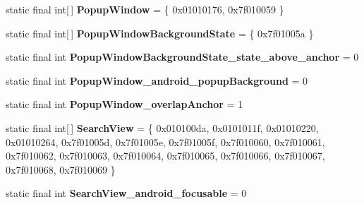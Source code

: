 \begin{DoxyCompactItemize}
\item 
\hypertarget{classandroid_1_1support_1_1v7_1_1appcompat_1_1_r_1_1styleable_abfcd5394a28e12e51efa5ac509687b26}{}static final int\mbox{[}$\,$\mbox{]} {\bfseries Popup\+Window} = \{ 0x01010176, 0x7f010059 \}\label{classandroid_1_1support_1_1v7_1_1appcompat_1_1_r_1_1styleable_abfcd5394a28e12e51efa5ac509687b26}

\item 
\hypertarget{classandroid_1_1support_1_1v7_1_1appcompat_1_1_r_1_1styleable_af780db5a661b33d826f07231dfde13ec}{}static final int\mbox{[}$\,$\mbox{]} {\bfseries Popup\+Window\+Background\+State} = \{ 0x7f01005a \}\label{classandroid_1_1support_1_1v7_1_1appcompat_1_1_r_1_1styleable_af780db5a661b33d826f07231dfde13ec}

\item 
\hypertarget{classandroid_1_1support_1_1v7_1_1appcompat_1_1_r_1_1styleable_a0288416ef672e1d476c6407516b89ee5}{}static final int {\bfseries Popup\+Window\+Background\+State\+\_\+state\+\_\+above\+\_\+anchor} = 0\label{classandroid_1_1support_1_1v7_1_1appcompat_1_1_r_1_1styleable_a0288416ef672e1d476c6407516b89ee5}

\item 
\hypertarget{classandroid_1_1support_1_1v7_1_1appcompat_1_1_r_1_1styleable_ac7f68e4984b94e3ebac98c9575349188}{}static final int {\bfseries Popup\+Window\+\_\+android\+\_\+popup\+Background} = 0\label{classandroid_1_1support_1_1v7_1_1appcompat_1_1_r_1_1styleable_ac7f68e4984b94e3ebac98c9575349188}

\item 
\hypertarget{classandroid_1_1support_1_1v7_1_1appcompat_1_1_r_1_1styleable_aee90697b851a641b8011c700b5153ffc}{}static final int {\bfseries Popup\+Window\+\_\+overlap\+Anchor} = 1\label{classandroid_1_1support_1_1v7_1_1appcompat_1_1_r_1_1styleable_aee90697b851a641b8011c700b5153ffc}

\item 
\hypertarget{classandroid_1_1support_1_1v7_1_1appcompat_1_1_r_1_1styleable_a01af09df9e38f1e4f57165c3d3cee9fe}{}static final int\mbox{[}$\,$\mbox{]} {\bfseries Search\+View} = \{ 0x010100da, 0x0101011f, 0x01010220, 0x01010264, 0x7f01005d, 0x7f01005e, 0x7f01005f, 0x7f010060, 0x7f010061, 0x7f010062, 0x7f010063, 0x7f010064, 0x7f010065, 0x7f010066, 0x7f010067, 0x7f010068, 0x7f010069 \}\label{classandroid_1_1support_1_1v7_1_1appcompat_1_1_r_1_1styleable_a01af09df9e38f1e4f57165c3d3cee9fe}

\item 
\hypertarget{classandroid_1_1support_1_1v7_1_1appcompat_1_1_r_1_1styleable_a45075e501403be7f1c519d24590d6ebf}{}static final int {\bfseries Search\+View\+\_\+android\+\_\+focusable} = 0\label{classandroid_1_1support_1_1v7_1_1appcompat_1_1_r_1_1styleable_a45075e501403be7f1c519d24590d6ebf}


\end{DoxyCompactItemize}
